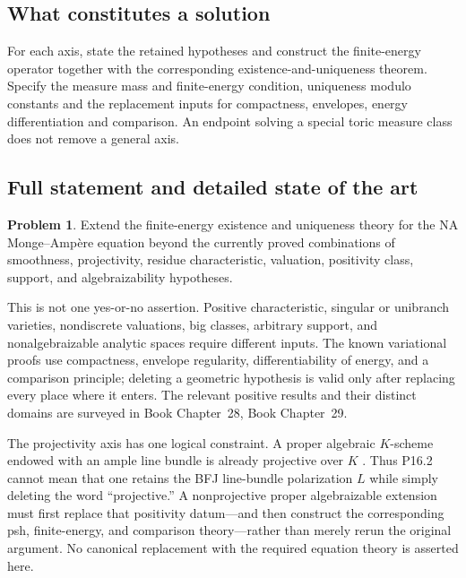 \documentclass[11pt,a4paper]{article}
\theoremstyle{definition}
\newtheorem{problem}{Problem}[section]
\theoremstyle{remark}
\begin{document}
\subsection{What constitutes a solution}
For each axis, state the retained hypotheses and construct the finite-energy operator together with the corresponding existence-and-uniqueness theorem. Specify the measure mass and finite-energy condition, uniqueness modulo constants and the replacement inputs for compactness, envelopes, energy differentiation and comparison. An endpoint solving a special toric measure class does not remove a general axis.

\subsection{Full statement and detailed state of the art}
\label{sec:ch72-general-ma}

\begin{problem}\label{prob:frontier-general-ma}
Extend the finite-energy existence and uniqueness theory for the NA
Monge--Ampère equation beyond the currently proved combinations of smoothness,
projectivity, residue characteristic, valuation, positivity class, support,
and algebraizability hypotheses.
\end{problem}

This is not one yes-or-no assertion.  Positive characteristic, singular or
unibranch varieties, nondiscrete valuations, big classes, arbitrary support,
and nonalgebraizable analytic spaces require different inputs.  The known
variational proofs use compactness, envelope regularity, differentiability of
energy, and a comparison principle; deleting a geometric hypothesis is valid
only after replacing every place where it enters.  The relevant positive
results and their distinct domains are surveyed in
Book Chapter~28, Book Chapter~29.

The projectivity axis has one logical constraint.  A proper algebraic
\(K\)-scheme endowed with an ample line bundle is already projective over
\(K\) \cite[Tag~0B5N]{StacksProject}.  Thus P16.2 cannot mean that one
retains the BFJ line-bundle polarization \(L\) while simply deleting the word
``projective.''  A nonprojective proper algebraizable extension must first
replace that positivity datum---and then construct the corresponding psh,
finite-energy, and comparison theory---rather than merely rerun the original
argument.  No canonical replacement with the required equation theory is
asserted here.
\end{document}
